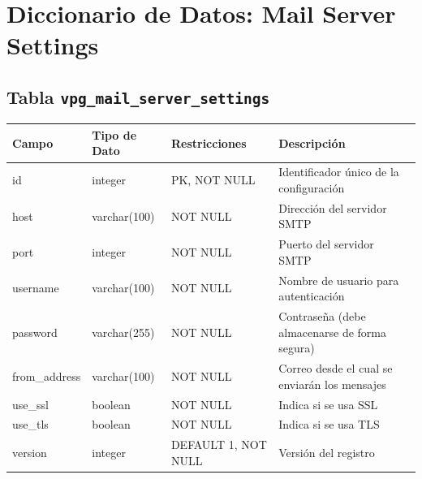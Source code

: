 \section{Diccionario de Datos: Mail Server Settings}
\begin{center}
	\subsection{Tabla \texttt{vpg\_mail\_server\_settings}}
	\small
	\begin{tabular}{|l|l|l|p{6cm}|}
		\hline
		\textbf{Campo} & \textbf{Tipo de Dato} & \textbf{Restricciones} & \textbf{Descripción}                          \\
		\hline
		id             & integer               & PK, NOT NULL           & Identificador único de la configuración       \\
		host           & varchar(100)          & NOT NULL               & Dirección del servidor SMTP                   \\
		port           & integer               & NOT NULL               & Puerto del servidor SMTP                      \\
		username       & varchar(100)          & NOT NULL               & Nombre de usuario para autenticación          \\
		password       & varchar(255)          & NOT NULL               & Contraseña (debe almacenarse de forma segura) \\
		from\_address  & varchar(100)          & NOT NULL               & Correo desde el cual se enviarán los mensajes \\
		use\_ssl       & boolean               & NOT NULL               & Indica si se usa SSL                          \\
		use\_tls       & boolean               & NOT NULL               & Indica si se usa TLS                          \\
		version        & integer               & DEFAULT 1, NOT NULL    & Versión del registro                          \\
		\hline
	\end{tabular}
	\normalsize
\end{center}
